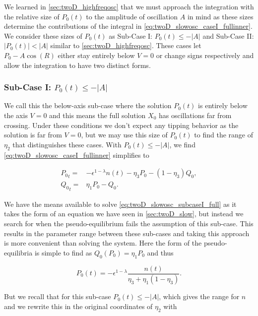 We learned in \autoref{sec:twoD_highfreqosc} that we must approach the integration with the relative size of $P_0(t)$ to the amplitude of oscillation $A$ in mind as these sizes determine the contributions of the integral in \eqref{eq:twoD_slowosc_caseI_fullinner}. We consider these sizes of $P_0(t)$ as Sub-Case I: $P_0(t)\le -|A|$ and Sub-Case II:$|P_0(t)|<|A|$ similar to \autoref{sec:twoD_highfreqosc}. These cases let $P_0-A\cos(R)$ either stay entirely below $V=0$ or change signs respectively and allow the integration to have two distinct forms.

\subsubsection{Sub-Case I: $P_0(t)\le -|A|$}

We call this the below-axis sub-case where the solution $P_0(t)$ is entirely below the axis $V=0$ and this means the full solution $X_0$ has oscillations far from crossing. Under these conditions we don't expect any tipping behavior as the solution is far from $V=0$, but we may use this size of $P_0(t)$ to find the range of $\eta_2$ that distinguishes these cases. With $P_0(t)\le -|A|$, we find \eqref{eq:twoD_slowosc_caseI_fullinner} simplifies to

\begin{equation}\label{eq:twoD_slowosc_subcaseI_full}
\begin{aligned}
{P_0}_t =&  -\epsilon^{1-\lambda} n(t) -\eta_3 P_0-(1-\eta_3)Q_0, \\
{Q_0}_t =&  \eta_1 P_0-Q_0.
\end{aligned}
\end{equation}

We have the means available to solve \eqref{eq:twoD_slowosc_subcaseI_full} as it takes the form of an equation we have seen in \autoref{sec:twoD_slow}, but instead we search for when the pseudo-equilibrium fails the assumption of this sub-case. This results in the parameter range between these sub-cases and taking this approach is more convenient than solving the system. Here the form of the pseudo-equilibria is simple to find as $Q_0(P_0) = \eta_1P_0$ and thus 

\begin{equation*}
P_0(t) = -\epsilon^{1-\lambda}\frac{n(t)}{\eta_3+\eta_1(1-\eta_3)}.
\end{equation*}

But we recall that for this sub-case $P_0(t)\le -|A|$, which gives the range for $n$ and we rewrite this in the original coordinates of $\eta_2$ with

